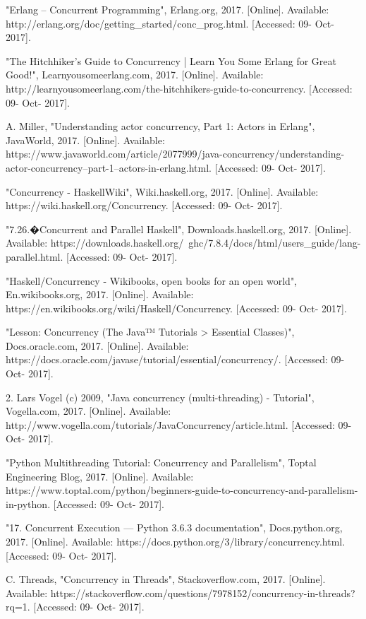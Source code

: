 \documentclass[conference]{IEEEtran}
\begin{document}
\begin{thebibliography}{00}
 "Erlang -- Concurrent Programming", Erlang.org, 2017. [Online]. Available: http://erlang.org/doc/getting\_started/conc\_prog.html. [Accessed: 09- Oct- 2017].

 "The Hitchhiker's Guide to Concurrency | Learn You Some Erlang for Great Good!", Learnyousomeerlang.com, 2017. [Online]. Available: http://learnyousomeerlang.com/the-hitchhikers-guide-to-concurrency. [Accessed: 09- Oct- 2017].

 A. Miller, "Understanding actor concurrency, Part 1: Actors in Erlang", JavaWorld, 2017. [Online]. Available: https://www.javaworld.com/article/2077999/java-concurrency/understanding-actor-concurrency--part-1--actors-in-erlang.html. [Accessed: 09- Oct- 2017].

 "Concurrency - HaskellWiki", Wiki.haskell.org, 2017. [Online]. Available: https://wiki.haskell.org/Concurrency. [Accessed: 09- Oct- 2017].

 "7.26.�Concurrent and Parallel Haskell", Downloads.haskell.org, 2017. [Online]. Available: https://downloads.haskell.org/~ghc/7.8.4/docs/html/users\_guide/lang-parallel.html. [Accessed: 09- Oct- 2017].

 "Haskell/Concurrency - Wikibooks, open books for an open world", En.wikibooks.org, 2017. [Online]. Available: https://en.wikibooks.org/wiki/Haskell/Concurrency. [Accessed: 09- Oct- 2017].

 "Lesson: Concurrency (The Java™ Tutorials > Essential Classes)", Docs.oracle.com, 2017. [Online]. Available: https://docs.oracle.com/javase/tutorial/essential/concurrency/. [Accessed: 09- Oct- 2017].

 2. Lars Vogel (c) 2009, "Java concurrency (multi-threading) - Tutorial", Vogella.com, 2017. [Online]. Available: http://www.vogella.com/tutorials/JavaConcurrency/article.html. [Accessed: 09- Oct- 2017].

 "Python Multithreading Tutorial: Concurrency and Parallelism", Toptal Engineering Blog, 2017. [Online]. Available: https://www.toptal.com/python/beginners-guide-to-concurrency-and-parallelism-in-python. [Accessed: 09- Oct- 2017].

 "17. Concurrent Execution — Python 3.6.3 documentation", Docs.python.org, 2017. [Online]. Available: https://docs.python.org/3/library/concurrency.html. [Accessed: 09- Oct- 2017].

 C. Threads, "Concurrency in Threads", Stackoverflow.com, 2017. [Online]. Available: https://stackoverflow.com/questions/7978152/concurrency-in-threads?rq=1. [Accessed: 09- Oct- 2017].


\end{thebibliography}
\end{document}
